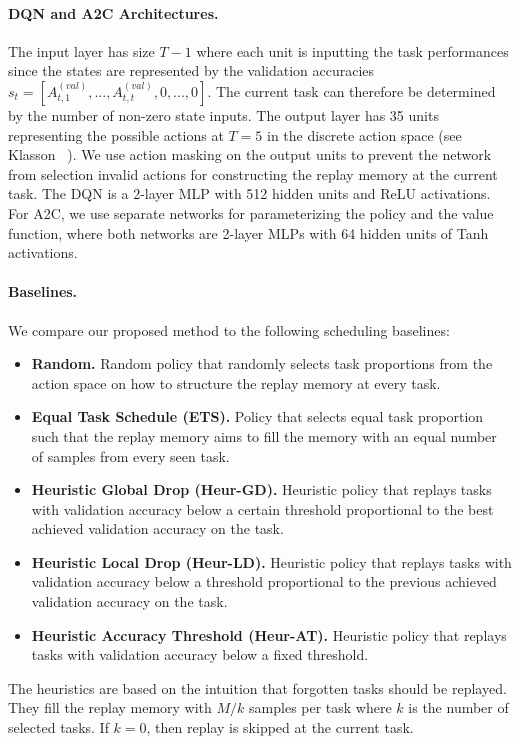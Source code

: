 \vspace{-3mm}
\paragraph{DQN and A2C Architectures.}
The input layer has size $T-1$ where each unit is inputting the task performances since the states are represented by the validation accuracies $s_t = [A_{t, 1}^{(val)}, ..., A_{t, t}^{(val)}, 0, ..., 0]$. The current task can therefore be determined by the number of non-zero state inputs. The output layer has 35 units representing the possible actions at $T=5$ in the discrete action space (see Klasson \etal~). We use action masking on the output units to prevent the network from selection invalid actions for constructing the replay memory at the current task. The DQN is a 2-layer MLP with 512 hidden units and ReLU activations. For A2C, we use separate networks for parameterizing the policy and the value function, where both networks are 2-layer MLPs with 64 hidden units of Tanh activations. 

\vspace{-3mm}
\paragraph{Baselines.} We compare our proposed method to the following scheduling baselines: 
\begin{itemize}[topsep=0pt]%
	\item {\bf Random.} Random policy that randomly selects task proportions from the action space on how to structure the replay memory at every task. 
	\item {\bf Equal Task Schedule (ETS).} Policy that selects equal task proportion such that the replay memory aims to fill the memory with an equal number of samples from every seen task. 
	\item {\bf Heuristic Global Drop (Heur-GD).} Heuristic policy that replays tasks with validation accuracy below a certain threshold proportional to the best achieved validation accuracy on the task.
	\item {\bf Heuristic Local Drop (Heur-LD).} Heuristic policy that replays tasks with validation accuracy below a threshold proportional to the previous achieved validation accuracy on the task. 
	\item {\bf Heuristic Accuracy Threshold (Heur-AT).} Heuristic policy that replays tasks with validation accuracy below a fixed threshold. 
\end{itemize}
The heuristics are based on the intuition that forgotten tasks should be replayed. They fill the replay memory with $M/k$ samples per task where $k$ is the number of selected tasks. If $k=0$, then replay is skipped at the current task. 

